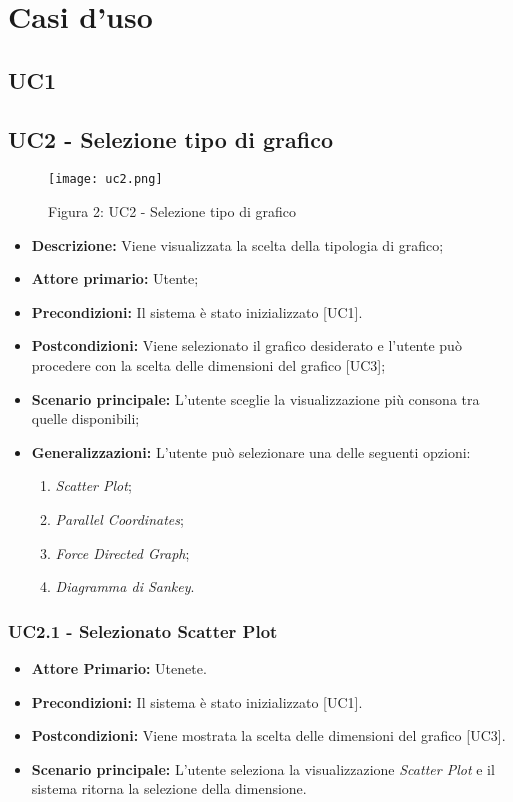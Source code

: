 \chapter{Casi d'uso}

\section{UC1}

\section{UC2 - Selezione tipo di grafico}
\begin{figure}[H]
 \texttt{[image: uc2.png]}
 \vspace{-5mm}
 \caption*{Figura 2: UC2 - Selezione tipo di grafico}
\end{figure}

 \begin{itemize}
     \item \textbf{Descrizione:} Viene visualizzata la scelta della tipologia di grafico;
     \item \textbf{Attore primario:} Utente;
     \item \textbf{Precondizioni:} Il sistema è stato inizializzato [UC1].
     \item \textbf{Postcondizioni:} Viene selezionato il grafico desiderato e l'utente può procedere con la scelta delle dimensioni del grafico [UC3];
     \item \textbf{Scenario principale:} L'utente sceglie la visualizzazione più consona tra quelle disponibili;
     \item \textbf{Generalizzazioni:} L'utente può selezionare una delle seguenti opzioni:
     \begin{enumerate}
         \item \textit{Scatter Plot};
         \item \textit{Parallel Coordinates};
         \item \textit{Force Directed Graph};
         \item \textit{Diagramma di Sankey}.
     \end{enumerate}
 \end{itemize}

 \subsection{UC2.1 - Selezionato Scatter Plot}
 \begin{itemize}
     \item \textbf{Attore Primario:} Utenete.
     \item \textbf{Precondizioni:} Il sistema è stato inizializzato [UC1].
     \item \textbf{Postcondizioni:} Viene mostrata la scelta delle dimensioni del grafico [UC3].
     \item \textbf{Scenario principale:} L'utente seleziona la visualizzazione \textit{Scatter Plot} e il sistema ritorna la selezione della dimensione.
 \end{itemize}
